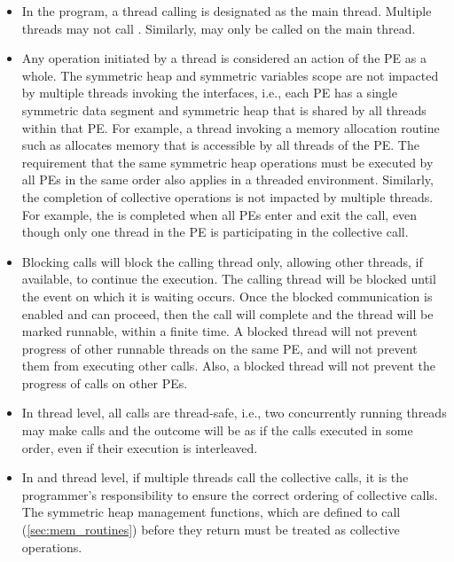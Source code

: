\begin{itemize}[leftmargin=*]

\item
In the \openshmem{} program, a thread calling  is designated as the main
thread. Multiple threads may not call . Similarly,
 may only be called on the main thread.

\item
Any \openshmem{} operation initiated by a thread is considered an action of the \ac{PE} as a whole.
The symmetric heap and symmetric variables scope
are not impacted by multiple threads invoking the
\openshmem{} interfaces, i.e., 
each \ac{PE} has a single symmetric data segment and symmetric heap that is shared by
all threads within that \ac{PE}.  For example, a thread invoking a memory allocation
routine such as  
allocates memory that is accessible by all threads of the \ac{PE}. 
The requirement that the same symmetric heap operations must
be executed by all \acp{PE} in the same order also applies in a threaded
environment. Similarly, the completion of collective operations is not impacted by multiple threads. 
For example, the  is completed when all \acp{PE} enter and
exit the  call, even though only one thread in the \ac{PE} is
participating in the collective call. 

\item Blocking \openshmem{} calls will block the calling thread only, allowing
other threads, if available, to continue the execution. The calling thread will be blocked until the
event on which it is waiting occurs. Once the blocked communication is enabled
and can proceed, then the call will complete and the thread will be marked
runnable, within a finite time. A blocked thread will not prevent progress of
other runnable threads on the same \ac{PE}, and will not prevent them from
executing other \openshmem{} calls. Also, a blocked thread will not prevent the
progress of \openshmem{} calls on other \acp{PE}. 

\item In  thread level, all \openshmem{} calls are thread-safe, 
i.e., two concurrently running threads may make \openshmem{} calls and the outcome will be as if the calls executed in
some order, even if their execution is interleaved.


\item
In  and  thread level, 
if multiple threads call the collective calls, it is the programmer's responsibility to ensure the correct ordering of
collective calls.  The symmetric heap management functions, which are defined to call
(\ref{sec:mem_routines}) before they return 
must be treated as collective operations.


\end{itemize} 
